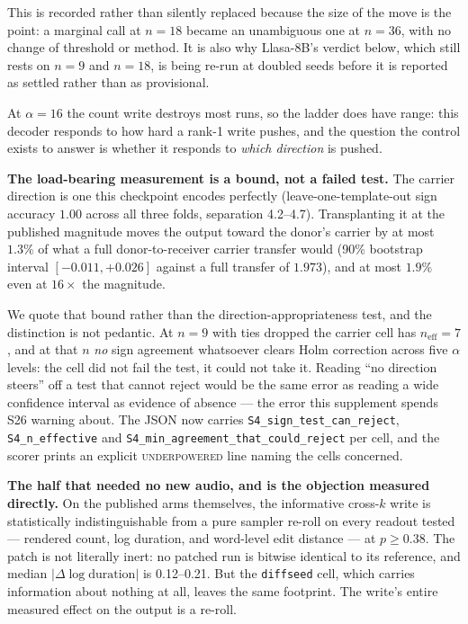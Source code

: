 \documentclass[11pt]{article}
\begin{document}
This is recorded rather than silently replaced because the size of the move is
the point: a marginal call at $n{=}18$ became an unambiguous one at $n{=}36$,
with no change of threshold or method. It is also why Llasa-8B's verdict below,
which still rests on $n{=}9$ and $n{=}18$, is being re-run at doubled seeds
before it is reported as settled rather than as provisional.

At $\alpha{=}16$ the count write destroys most runs, so the ladder does have
range: this decoder responds to how hard a rank-1 write pushes, and the question
the control exists to answer is whether it responds to \emph{which direction} is
pushed.

\textbf{The load-bearing measurement is a bound, not a failed test.} The carrier
direction is one this checkpoint encodes perfectly (leave-one-template-out sign
accuracy $1.00$ across all three folds, separation 4.2--4.7). Transplanting it at
the published magnitude moves the output toward the donor's carrier by at most
$1.3\%$ of what a full donor-to-receiver carrier transfer would (90\% bootstrap
interval $[-0.011, +0.026]$ against a full transfer of $1.973$), and at most
$1.9\%$ even at $16\times$ the magnitude.

We quote that bound rather than the direction-appropriateness test, and the
distinction is not pedantic. At $n{=}9$ with ties dropped the carrier cell has
$n_{\text{eff}}{=}7$, and at that $n$ \emph{no} sign agreement whatsoever clears
Holm correction across five $\alpha$ levels: the cell did not fail the test, it
could not take it. Reading ``no direction steers'' off a test that cannot reject
would be the same error as reading a wide confidence interval as evidence of
absence --- the error this supplement spends S26 warning about. The JSON now
carries \texttt{S4\_sign\_test\_can\_reject}, \texttt{S4\_n\_effective} and
\texttt{S4\_min\_agreement\_that\_could\_reject} per cell, and the scorer prints
an explicit \textsc{underpowered} line naming the cells concerned.

\textbf{The half that needed no new audio, and is the objection measured
directly.} On the published arms themselves, the informative cross-$k$ write is
statistically indistinguishable from a pure sampler re-roll on every readout
tested --- rendered count, log duration, and word-level edit distance --- at
$p \ge 0.38$. The patch is not literally inert: no patched run is bitwise
identical to its reference, and median $|\Delta \log \text{duration}|$ is
0.12--0.21. But the \texttt{diffseed} cell, which carries information about
nothing at all, leaves the same footprint. The write's entire measured effect on
the output is a re-roll.
\end{document}
